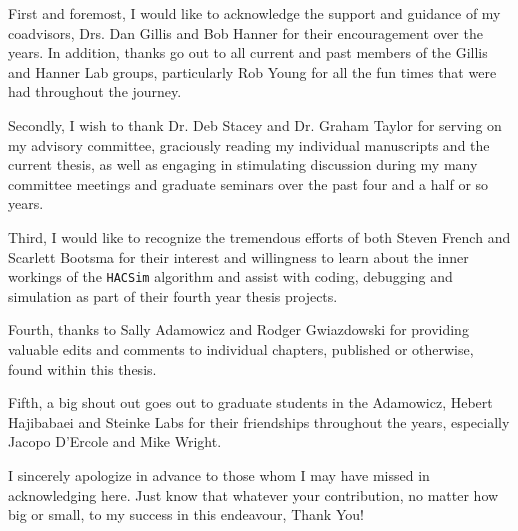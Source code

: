 \begin{acknowledgements}\label{acknow}
\ssp

\noindent First and foremost, I would like to acknowledge the support and guidance of my \\ coadvisors, Drs. Dan Gillis and Bob Hanner for their encouragement over the years. In addition, thanks go out to all current and past members of the Gillis and Hanner Lab groups, particularly Rob Young for all the fun times that were had throughout the journey.

\vspace{5mm}

\noindent Secondly, I wish to thank Dr. Deb Stacey and Dr. Graham Taylor for serving on my advisory committee, graciously reading my individual manuscripts and the current thesis, as well as engaging in stimulating discussion during my many committee meetings and graduate seminars over the past four and a half or so years.

\vspace{5mm}

\noindent Third, I would like to recognize the tremendous efforts of both Steven French and Scarlett Bootsma for their interest and willingness to learn about the inner workings of the {\tt HACSim} algorithm and assist with coding, debugging and simulation as part of their fourth year thesis projects.

\vspace{5mm}

\noindent Fourth, thanks to Sally Adamowicz and Rodger Gwiazdowski for providing \\ valuable edits and comments to individual chapters, published or otherwise, found within this thesis.

\vspace{5mm}

\noindent Fifth, a big shout out goes out to graduate students in the Adamowicz, Hebert \\ Hajibabaei and Steinke Labs for their friendships throughout the years, especially Jacopo D'Ercole and Mike Wright.

\vspace{5mm}

\noindent I sincerely apologize in advance to those whom I may have missed in acknowledging here. Just know that whatever your contribution, no matter how big or small, to my success in this endeavour, Thank You!

\vspace{5mm}


\end{acknowledgements}
